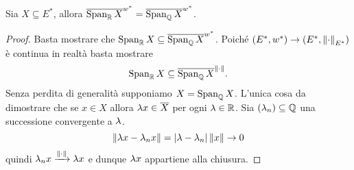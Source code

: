 \documentclass[a4paper]{article}
\newcommand{\normd}{{\norm{\cdot}}}
\begin{document}

\begin{lemma}[]\label{LmChiusuraSpanSuQ}
Sia $X\subseteq E^\ast$, allora
$\overline{\operatorname{Span}_{\mathbb{R}} X}^{w^\ast}=\overline{\operatorname{Span}_{\mathbb{Q}} X}^{w^\ast}$.
\end{lemma}
\begin{proof}
Basta mostrare che $\operatorname{Span}_{\mathbb{R}} X\subseteq \overline{\operatorname{Span}_{\mathbb{Q}} X}^{w^\ast}$. Poich\'e $(E^\ast,w^\ast)\to (E^\ast,\normd_{E^\ast})$ \`e continua in realt\`a basta mostrare
\[\Span_\R X\subseteq \ol{\Span_\Q X}^{\normd}.\]
Senza perdita di generalit\`a supponiamo $X=\operatorname{Span}_{\mathbb{Q}} X$. L'unica cosa da dimostrare che se $x\in X$ allora $\lambda x\in \overline{X}$ per ogni $\lambda\in \mathbb{R}$. Sia $(\lambda_n)\subseteq \mathbb{Q}$ una successione convergente a $\lambda$.
\[\left\Vert{\lambda x-\lambda_n x}\right\Vert=\left|{\lambda-\lambda_n}\right|\left\Vert{x}\right\Vert\to 0\]
quindi $\la_n x\xrightarrow{\normd} \la x$ e dunque $\lambda x$ appartiene alla chiusura.
\end{proof}
\end{document}
